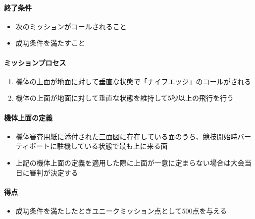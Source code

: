 \documentclass[a4paper,12pt,oneside]{jsarticle}
\begin{document}
\paragraph{終了条件}
\begin{itemize}
  \item 次のミッションがコールされること
  \item 成功条件を満たすこと
\end{itemize}

\paragraph{ミッションプロセス}
\begin{enumerate}
  \item 機体の上面が地面に対して垂直な状態で「ナイフエッジ」のコールがされる
  \item 機体の上面が地面に対して垂直な状態を維持して5秒以上の飛行を行う
\end{enumerate}

\paragraph{機体上面の定義}
\begin{itemize}
  \item 機体審査用紙に添付された三面図に存在している面のうち、競技開始時バーティポートに駐機している状態で最も上に来る面
  \item 上記の機体上面の定義を適用した際に上面が一意に定まらない場合は大会当日に審判が決定する
\end{itemize}
\paragraph{得点}
\begin{itemize}
  \item 成功条件を満たしたときユニークミッション点として500点を与える
\end{itemize}
\end{document}

